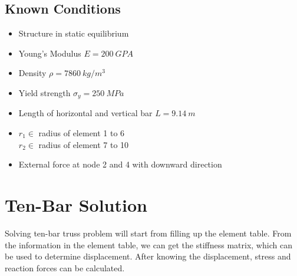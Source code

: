 \documentclass[12pt, a4paper]{article}
\begin{document}
\subsection*{Known Conditions}
\begin{itemize}
    \item Structure in static equilibrium
    \item Young's Modulus $E = 200 \ GPA$
    \item Density $\rho = 7860\ kg/m^3$
    \item Yield strength $\sigma_y=250\ MPa$
    \item Length of horizontal and vertical bar $L=9.14\ m$
    \item $r_1 \in $ radius of element 1 to 6\\$r_2 \in$ radius of element 7 to 10
    \item External force at node 2 and 4 with downward direction
\end{itemize}

\section{Ten-Bar Solution}
\qquad Solving ten-bar truss problem will start from filling up the element table. From the information in the element table, we can get the stiffness matrix, which can be used to determine displacement. After knowing the displacement, stress and reaction forces can be calculated.
\end{document}

